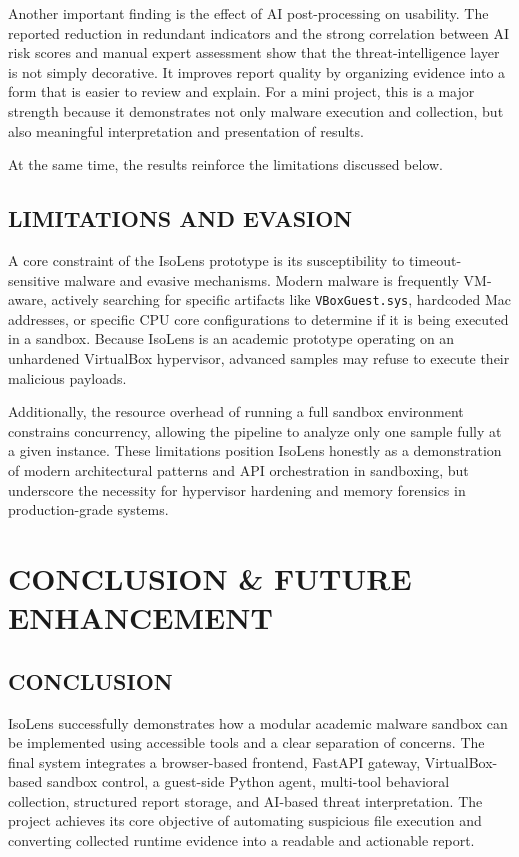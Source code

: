 \documentclass[a4paper,12pt,oneside]{report}
\begin{document}
\par

\par

Another important finding is the effect of AI post-processing on usability. The reported reduction in redundant indicators and the strong correlation between AI risk scores and manual expert assessment show that the threat-intelligence layer is not simply decorative. It improves report quality by organizing evidence into a form that is easier to review and explain. For a mini project, this is a major strength because it demonstrates not only malware execution and collection, but also meaningful interpretation and presentation of results.

At the same time, the results reinforce the limitations discussed below.

\section{LIMITATIONS AND EVASION}
A core constraint of the IsoLens prototype is its susceptibility to timeout-sensitive malware and evasive mechanisms. Modern malware is frequently VM-aware, actively searching for specific artifacts like \texttt{VBoxGuest.sys}, hardcoded Mac addresses, or specific CPU core configurations to determine if it is being executed in a sandbox. Because IsoLens is an academic prototype operating on an unhardened VirtualBox hypervisor, advanced samples may refuse to execute their malicious payloads. 

\par

\par

Additionally, the resource overhead of running a full sandbox environment constrains concurrency, allowing the pipeline to analyze only one sample fully at a given instance. These limitations position IsoLens honestly as a demonstration of modern architectural patterns and API orchestration in sandboxing, but underscore the necessity for hypervisor hardening and memory forensics in production-grade systems.

\chapter{CONCLUSION \& FUTURE ENHANCEMENT}
\section{CONCLUSION}
IsoLens successfully demonstrates how a modular academic malware sandbox can be implemented using accessible tools and a clear separation of concerns. The final system integrates a browser-based frontend, FastAPI gateway, VirtualBox-based sandbox control, a guest-side Python agent, multi-tool behavioral collection, structured report storage, and AI-based threat interpretation. The project achieves its core objective of automating suspicious file execution and converting collected runtime evidence into a readable and actionable report.
\end{document}
